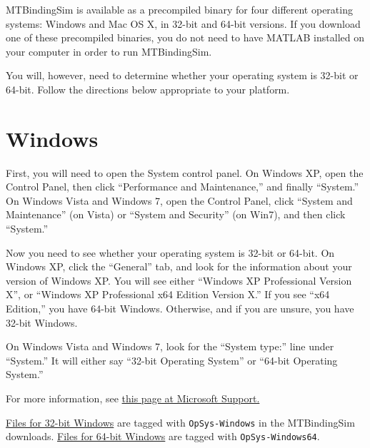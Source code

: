
MTBindingSim is available as a precompiled binary for four different
operating systems: Windows and Mac OS X, in 32-bit and 64-bit versions.
If you download one of these precompiled binaries, you do not need to
have MATLAB installed on your computer in order to run MTBindingSim.

You will, however, need to determine whether your operating system is
32-bit or 64-bit.  Follow the directions below appropriate to your
platform.



\section{Windows%
}

\noindent{}

First, you will need to open the System control panel.  On Windows XP,
open the Control Panel, then click ``Performance and Maintenance,'' and
finally ``System.''  On Windows Vista and Windows 7, open the Control
Panel, click ``System and Maintenance'' (on Vista) or ``System and Security''
(on Win7), and then click ``System.''

Now you need to see whether your operating system is 32-bit or 64-bit.
On Windows XP, click the ``General'' tab, and look for the information
about your version of Windows XP.  You will see either ``Windows XP
Professional Version X'', or ``Windows XP Professional x64 Edition Version
X.''  If you see ``x64 Edition,'' you have 64-bit Windows.  Otherwise, and
if you are unsure, you have 32-bit Windows.

On Windows Vista and Windows 7, look for the ``System type:'' line under
``System.''  It will either say ``32-bit Operating System'' or ``64-bit
Operating System.''

For more information, see \href{http://support.microsoft.com/kb/827218}{this page at Microsoft Support.}

\href{http://code.google.com/p/mtbindingsim/downloads/list?q=OpSys-Windows}{Files for 32-bit Windows}
are tagged with \texttt{OpSys-Windows} in the MTBindingSim downloads.  \href{http://code.google.com/p/mtbindingsim/downloads/list?q=OpSys-Windows64}{Files
for 64-bit Windows}
are tagged with \texttt{OpSys-Windows64}.



